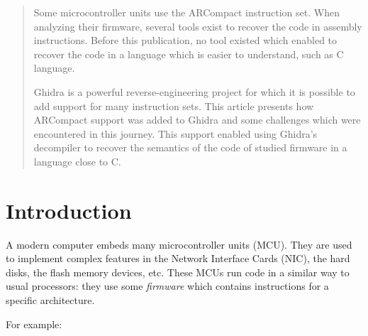 
\setcounter{tocdepth}{2}  %

\ifdefined\pdftrailerid
  \pdftrailerid{} %
\fi

\maketitle
{}

\begin{abstract}
Some microcontroller units use the ARCompact instruction set.
When analyzing their firmware, several tools exist to recover the code in assembly instructions.
Before this publication, no tool existed which enabled to recover the code in a language which is easier to understand, such as C language.

Ghidra is a powerful reverse-engineering project for which it is possible to add support for many instruction sets.
This article presents how ARCompact support was added to Ghidra and some challenges which were encountered in this journey.
This support enabled using Ghidra's decompiler to recover the semantics of the code of studied firmware in a language close to C.
\end{abstract}

\section{Introduction}

A modern computer embeds many microcontroller units (MCU). They are used
to implement complex features in the Network Interface Cards (NIC), the
hard disks, the flash memory devices, etc. These MCUs run code in a
similar way to usual processors: they use some \emph{firmware} which
contains instructions for a specific architecture.

For example:

